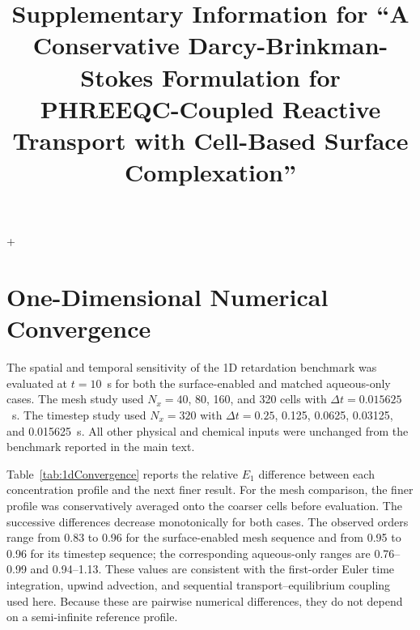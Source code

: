 \documentclass[pdflatex,sn-basic]{sn-jnl}
\begin{document}
\title[Supplementary Information]{Supplementary Information for ``A
Conservative Darcy-Brinkman-Stokes Formulation for PHREEQC-Coupled Reactive
Transport with Cell-Based Surface Complexation''}

\author*[1,2]{ }
\author[1,2]{ }
\author[1,2]{ }


\maketitle

+\section{One-Dimensional Numerical Convergence}

The spatial and temporal sensitivity of the 1D retardation
benchmark was evaluated at $t=10$~s for both the surface-enabled and matched
aqueous-only cases. The mesh study used $N_x=40$, 80, 160, and 320 cells with
$\Delta t=0.015625$~s. The timestep study used $N_x=320$ with
$\Delta t=0.25$, 0.125, 0.0625, 0.03125, and 0.015625~s. All other physical and
chemical inputs were unchanged from the benchmark reported in the main text.

Table~\ref{tab:1dConvergence} reports the relative $E_1$ difference between
each concentration profile and the next finer result. For the mesh comparison,
the finer profile was conservatively averaged onto the coarser cells before
evaluation. The successive differences decrease monotonically for both cases.
The observed orders range from 0.83 to 0.96 for the surface-enabled mesh
sequence and from 0.95 to 0.96 for its timestep sequence; the corresponding
aqueous-only ranges are 0.76--0.99 and 0.94--1.13. These values are consistent
with the first-order Euler time integration, upwind advection, and sequential
transport--equilibrium coupling used here. Because these are pairwise numerical
differences, they do not depend on a semi-infinite reference profile.
\end{document}
